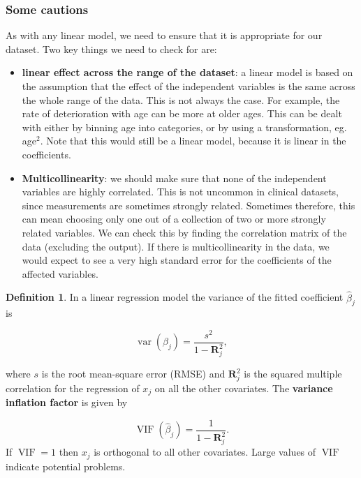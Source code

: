 \documentclass[
  openany]{book}
\providecommand{\tightlist}{%
  \setlength{\itemsep}{0pt}\setlength{\parskip}{0pt}}
\theoremstyle{definition}
\newtheorem{definition}{Definition}[chapter]
\theoremstyle{definition}
\theoremstyle{definition}
\theoremstyle{definition}
\theoremstyle{remark}
\begin{document}
\subsubsection*{Some cautions}\label{some-cautions}

As with any linear model, we need to ensure that it is appropriate for our dataset. Two key things we need to check for are:

\begin{itemize}
\tightlist
\item
  \textbf{linear effect across the range of the dataset}: a linear model is based on the assumption that the effect of the independent variables is the same across the whole range of the data. This is not always the case. For example, the rate of deterioration with age can be more at older ages. This can be dealt with either by binning age into categories, or by using a transformation, eg. age\(^2\). Note that this would still be a linear model, because it is linear in the coefficients.
\item
  \textbf{Multicollinearity}: we should make sure that none of the independent variables are highly correlated. This is not uncommon in clinical datasets, since measurements are sometimes strongly related. Sometimes therefore, this can mean choosing only one out of a collection of two or more strongly related variables. We can check this by finding the correlation matrix of the data (excluding the output). If there is multicollinearity in the data, we would expect to see a very high standard error for the coefficients of the affected variables.
\end{itemize}

\begin{definition}
In a linear regression model the variance of the fitted coefficient \(\hat\beta_j\) is

\[\operatorname{var}\left(\hat\beta_j\right) = \frac{s^2}{1-\mathbf{R}^2_j},\]

where \(s\) is the root mean-square error (RMSE) and \(\mathbf{R}^2_j\) is the squared multiple correlation for the regression of \(x_j\) on all the other covariates. The \textbf{variance inflation factor} is given by

\[\operatorname{VIF}\left(\hat\beta_j\right) = \frac{1}{1-\mathbf{R}^2_j}.\]
If \(\operatorname{VIF}=1\) then \(x_j\) is orthogonal to all other covariates. Large values of \(\operatorname{VIF}\) indicate potential problems.
\end{definition}
\end{document}
